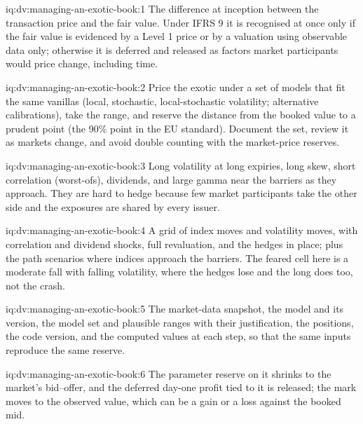 \begin{solution}{iq:dv:managing-an-exotic-book:1}
The difference at inception between the transaction price and the fair value. Under IFRS 9 it is recognised at once only if the fair value is evidenced by a Level 1 price or
by a valuation using observable data only; otherwise it is deferred and released as factors market participants would price change, including time.
\end{solution}

\begin{solution}{iq:dv:managing-an-exotic-book:2}
Price the exotic under a set of models that fit the same vanillas (local, stochastic, local-stochastic volatility; alternative calibrations), take the range, and reserve the
distance from the booked value to a prudent point (the 90\% point in the EU standard). Document the set, review it as markets change, and avoid double counting with the
market-price reserves.
\end{solution}

\begin{solution}{iq:dv:managing-an-exotic-book:3}
Long volatility at long expiries, long skew, short correlation (worst-ofs), dividends, and large gamma near the barriers as they approach. They are hard to hedge because few
market participants take the other side and the exposures are shared by every issuer.
\end{solution}

\begin{solution}{iq:dv:managing-an-exotic-book:4}
A grid of index moves and volatility moves, with correlation and dividend shocks, full revaluation, and the hedges in place; plus the path scenarios where indices approach the
barriers. The feared cell here is a moderate fall with falling volatility, where the hedges lose and the long  does too, not the crash.
\end{solution}

\begin{solution}{iq:dv:managing-an-exotic-book:5}
The market-data snapshot, the model and its version, the model set and plausible ranges with their justification, the positions, the code version, and the computed values at each
step, so that the same inputs reproduce the same reserve.
\end{solution}

\begin{solution}{iq:dv:managing-an-exotic-book:6}
The parameter reserve on it shrinks to the market's bid--offer, and the deferred day-one profit tied to it is released; the mark moves to the observed value, which can be a gain
or a loss against the booked mid.
\end{solution}
